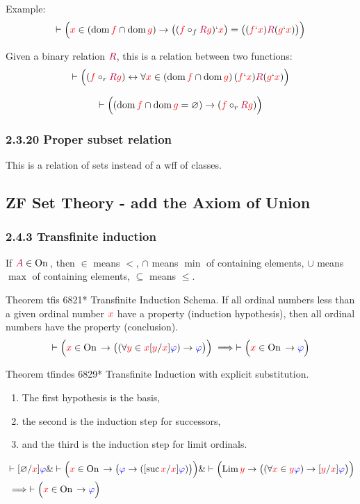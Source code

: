 \documentclass[12pt, letterpaper]{article}
\newcommand{\red}[1]{{\color{red} #1}}
\newcommand{\blue}[1]{{\color{blue} #1}}
\newcommand{\purple}[1]{{\color{purple} #1}}
\renewcommand{\emptyset}{\varnothing}
\newcommand{\provable}{\vdash}
\newcommand{\ra}{\rightarrow}
\newcommand{\lra}{\leftrightarrow}
\newcommand{\setvar}{\red}
\newcommand{\wff}{\blue}
\newcommand{\classvar}{\purple}
\newcommand{\wffphi}{\wff{\varphi}}
\newcommand{\sff}{\setvar{f}}
\newcommand{\sg}{\setvar{g}}
\newcommand{\sx}{\setvar{x}}
\newcommand{\sy}{\setvar{y}}
\newcommand{\clA}{\classvar{A}}
\newcommand{\clR}{\classvar{R}}
\newcommand{\at}{`}
\newcommand{\dom}{{\operatorname{dom}\,}}
\newcommand{\suc}{{\operatorname{suc}\,}}
\newcommand{\Lim}{{\operatorname{Lim}\,}}
\newcommand{\On}{{\operatorname{On}\,}}
\theoremstyle{definition}
\theoremstyle{remark}
\theoremstyle{definition}
\theoremstyle{plain}
\begin{document}
	Example:
	\[\provable \Big( \sx\in(\dom\sff\cap\dom\sg)\ra
	 \big((\setvar{f}\circ_f\clR\setvar{g})\at\sx\big) = \big((\sff\at\sx)\clR(\sg\at\sx)\big)\Big) \]
	 
	Given a binary relation $\clR$, this is a relation between two functions:
	\[\provable \Big( (\sff\circ_r\clR\sg)  \lra \forall
	\sx \in (\dom\sff\cap\dom\sg)\, (\sff\at\sx)\clR(\sg\at\sx) \Big) \]
	
	\[\provable \Big( (\dom\sff\cap\dom\sg=\emptyset)\ra (\sff\circ_r\clR\sg) \Big) \]
	
	\subsubsection*{2.3.20  Proper subset relation}
	This is a relation of sets instead of a wff of classes.
	
	\subsection{ZF Set Theory - add the Axiom of Union}
	\subsubsection*{2.4.3  Transfinite induction}
	
	\blue{If $\clA \in \On$, then $\in$ means $<$, $\cap$ means $\min$ of containing elements, $\cup$ means $\max$ of containing elements, $\subseteq$ means $\le$.}
	
	Theorem	tfis 6821*	Transfinite Induction Schema.
	If all ordinal numbers less than a given ordinal number $\sx$ have a property (induction hypothesis),
	then all ordinal numbers have the property (conclusion).
	\[\provable\Big(\sx\in\On \ra \big((\forall\sy\in\sx[\sy/\sx]\wffphi)\ra\wffphi\big) \Big)\implies\provable\Big(\sx\in\On\ra\wffphi\Big) \]
	
	Theorem	tfindes 6829*	Transfinite Induction with explicit substitution.
	\begin{enumerate}
		\item The first hypothesis is the basis,
		\item the second is the induction step for successors, 
		\item and the third is the induction step for limit ordinals.
	\end{enumerate}
	\[\begin{aligned}
		&\provable[\emptyset/\sx]\wffphi \& \provable \Big(\sx\in\On\ra \big(\wffphi\ra([\suc\sx/\sx]\wffphi)\big) \Big)\&
		\provable \Big(\Lim\sy\ra\big((\forall\sx\in\sy\wffphi) \ra[\sy/\sx]\wffphi\big)\Big)\\
		&\implies
		\provable\Big(\sx\in\On\ra\wffphi\Big)
	\end{aligned} \]
	
\end{document}

